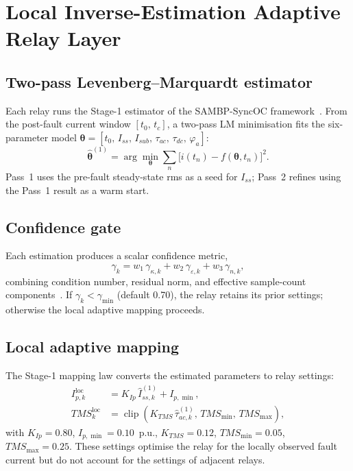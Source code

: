 \documentclass[journal,twoside,letterpaper]{IEEEtran}
\newcommand{\vect}[1]{\bm{#1}}
\newcommand{\est}[1]{\hat{#1}}
\DeclareMathOperator{\clip}{clip}
\begin{document}
\section{Local Inverse-Estimation Adaptive Relay Layer}
\label{sec:local}

\subsection{Two-pass Levenberg--Marquardt estimator}

Each relay runs the Stage-1 estimator of the SAMBP-SyncOC
framework~\cite{Eluvathingal2025_TR01}.
From the post-fault current window $[t_0,\,t_c]$, a
two-pass LM minimisation fits the six-parameter model
$\vect\theta = [t_0,\,I_{ss},\,I_{sub},\,\tau_{ac},\,
                \tau_{dc},\,\varphi_a]$:
\begin{equation}
  \est{\vect\theta}^{(1)} = \arg\min_{\vect\theta}
    \sum_{n} \bigl[i(t_n) - f(\vect\theta,t_n)\bigr]^2.
\label{eq:lm_obj}
\end{equation}
Pass~1 uses the pre-fault steady-state rms as a seed for
$I_{ss}$; Pass~2 refines using the Pass~1 result as a warm
start.

\subsection{Confidence gate}

Each estimation produces a scalar confidence metric,
\begin{equation}
  \gamma_k = w_1\,\gamma_{\kappa,k} + w_2\,\gamma_{\varepsilon,k}
              + w_3\,\gamma_{n,k},
\label{eq:confidence}
\end{equation}
combining condition number, residual norm, and effective
sample-count components~\cite{Eluvathingal2025_TR01}.
If $\gamma_k < \gamma_{\min}$ (default 0.70), the relay retains
its prior settings; otherwise the local adaptive mapping
proceeds.

\subsection{Local adaptive mapping}

The Stage-1 mapping law converts the estimated parameters to
relay settings:
\begin{align}
  I_{p,k}^{\mathrm{loc}} &= K_{Ip}\,\est{I}_{ss,k}^{(1)}
                             + I_{p,\min}, \label{eq:ip_map}\\
  TMS_k^{\mathrm{loc}}   &= \clip\!\left(
                             K_{TMS}\,\est\tau_{ac,k}^{(1)},\,
                             TMS_{\min},\,TMS_{\max}\right), \label{eq:tms_map}
\end{align}
with $K_{Ip}=0.80$, $I_{p,\min}=0.10$~p.u., $K_{TMS}=0.12$,
$TMS_{\min}=0.05$, $TMS_{\max}=0.25$.
These settings optimise the relay for the locally observed
fault current but do not account for the settings of
adjacent relays.
\end{document}
